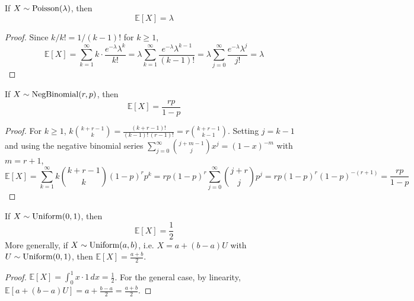   \begin{theorem}
    \label{thm:expectation-of-poisson}
    If \hyperref[def:poisson-random-variable]{$X \sim \operatorname{Poisson}(\lambda)$}, then 
    \begin{equation}
      \mathbb{E}[X] = \lambda
    \end{equation}
  \end{theorem}
  \begin{proof}
    Since $k / k! = 1 / (k-1)!$ for $k \geq 1$, 
    \begin{equation}
      \mathbb{E}[X] = \sum_{k=1}^\infty k \cdot \frac{e^{-\lambda} \lambda^k}{k!} = \lambda \sum_{k=1}^\infty \frac{e^{-\lambda} \lambda^{k-1}}{(k-1)!} = \lambda \sum_{j=0}^\infty \frac{e^{-\lambda} \lambda^j}{j!} = \lambda
    \end{equation}
  \end{proof}

  \begin{theorem}
    \label{thm:expectation-of-negative-binomial}
    If \hyperref[def:negative-binomial-distribution]{$X \sim \operatorname{NegBinomial}(r, p)$}, then 
    \begin{equation}
      \mathbb{E}[X] = \frac{r p}{1 - p}
    \end{equation}
  \end{theorem}
  \begin{proof}
    For $k \geq 1$, $k \binom{k+r-1}{k} = \frac{(k+r-1)!}{(k-1)! \, (r-1)!} = r \binom{k+r-1}{k-1}$. Setting $j = k - 1$ and using the negative binomial series $\sum_{j=0}^\infty \binom{j+m-1}{j} x^j = (1 - x)^{-m}$ with $m = r + 1$, 
    \begin{equation}
      \mathbb{E}[X] = \sum_{k=1}^\infty k \binom{k+r-1}{k} (1-p)^r p^k = r p (1-p)^r \sum_{j=0}^\infty \binom{j+r}{j} p^j = r p (1-p)^r (1 - p)^{-(r+1)} = \frac{rp}{1-p}
    \end{equation}
  \end{proof}

  \begin{theorem}
    \label{thm:expectation-of-continuous-uniform}
    If \hyperref[def:uniform-random-variable-2]{$X \sim \operatorname{Uniform}(0, 1)$}, then 
    \begin{equation}
      \mathbb{E}[X] = \frac{1}{2}
    \end{equation}
    More generally, if $X \sim \operatorname{Uniform}(a, b)$, i.e. $X = a + (b - a) U$ with $U \sim \operatorname{Uniform}(0, 1)$, then $\mathbb{E}[X] = \frac{a + b}{2}$. 
  \end{theorem}
  \begin{proof}
    $\mathbb{E}[X] = \int_0^1 x \cdot 1 \,dx = \frac{1}{2}$. For the general case, by linearity, $\mathbb{E}[a + (b - a) U] = a + \frac{b - a}{2} = \frac{a + b}{2}$. 
  \end{proof}

